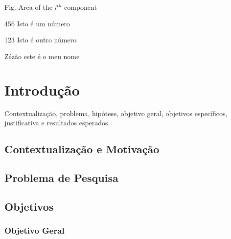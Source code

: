 \documentclass[12pt, %
openright, 
oneside, %
a4paper,    %
brazil]{facom-ufu-abntex2}
\begin{document}
\begin{siglas} %
  \item[Fig.] Area of the $i^{th}$ component
  \item[456] Isto é um número
  \item[123] Isto é outro número
  \item[Zézão] este é o meu nome
\end{siglas}


\tableofcontents*
\cleardoublepage





\textual



\chapter[Introdução]{Introdução}
Contextualização, problema, hipótese, objetivo geral, objetivos específicos, justificativa e resultados esperados.
\section{Contextualização e Motivação}
\section{Problema de Pesquisa}
\section{Objetivos}
\subsection{Objetivo Geral}
\end{document}
